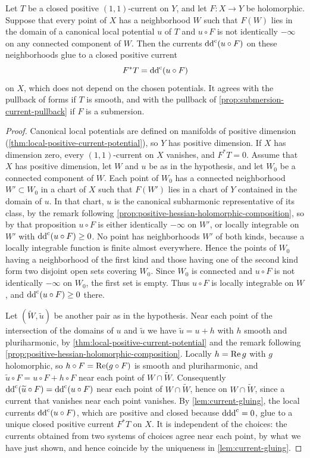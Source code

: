 \begin{proposition}\label{prop:potential-current-pullback}
Let $T$ be a closed positive $(1,1)$-current on $Y$, and let $F\colon X\to Y$ be holomorphic. Suppose that every point of $X$ has a neighborhood $W$ such that $F(W)$ lies in the domain of a canonical local potential $u$ of $T$ and $u\circ F$ is not identically $-\infty$ on any connected component of $W$. Then the currents $\mathrm{dd}^{\mathrm{c}}(u\circ F)$ on these neighborhoods glue to a closed positive current
\[
 F^*T=\mathrm{dd}^{\mathrm{c}}(u\circ F)
\]
on $X$, which does not depend on the chosen potentials. It agrees with the pullback of forms if $T$ is smooth, and with the pullback of \cref{prop:submersion-current-pullback} if $F$ is a submersion.
\end{proposition}
\begin{proof}
Canonical local potentials are defined on manifolds of positive dimension (\cref{thm:local-positive-current-potential}), so $Y$ has positive dimension. If $X$ has dimension zero, every $(1,1)$-current on $X$ vanishes, and $F^*T=0$. Assume that $X$ has positive dimension, let $W$ and $u$ be as in the hypothesis, and let $W_0$ be a connected component of $W$. Each point of $W_0$ has a connected neighborhood $W'\subset W_0$ in a chart of $X$ such that $F(W')$ lies in a chart of $Y$ contained in the domain of $u$. In that chart, $u$ is the canonical subharmonic representative of its class, by the remark following \cref{prop:positive-hessian-holomorphic-composition}, so by that proposition $u\circ F$ is either identically $-\infty$ on $W'$, or locally integrable on $W'$ with $\mathrm{dd}^{\mathrm{c}}(u\circ F)\geq0$. No point has neighborhoods $W'$ of both kinds, because a locally integrable function is finite almost everywhere. Hence the points of $W_0$ having a neighborhood of the first kind and those having one of the second kind form two disjoint open sets covering $W_0$. Since $W_0$ is connected and $u\circ F$ is not identically $-\infty$ on $W_0$, the first set is empty. Thus $u\circ F$ is locally integrable on $W$, and $\mathrm{dd}^{\mathrm{c}}(u\circ F)\geq0$ there.

Let $(\widetilde W,\widetilde u)$ be another pair as in the hypothesis. Near each point of the intersection of the domains of $u$ and $\widetilde u$ we have $\widetilde u=u+h$ with $h$ smooth and pluriharmonic, by \cref{thm:local-positive-current-potential} and the remark following \cref{prop:positive-hessian-holomorphic-composition}. Locally $h=\operatorname{Re} g$ with $g$ holomorphic, so $h\circ F=\operatorname{Re}(g\circ F)$ is smooth and pluriharmonic, and $\widetilde u\circ F=u\circ F+h\circ F$ near each point of $W\cap\widetilde W$. Consequently $\mathrm{dd}^{\mathrm{c}}(\widetilde u\circ F)=\mathrm{dd}^{\mathrm{c}}(u\circ F)$ near each point of $W\cap\widetilde W$, hence on $W\cap\widetilde W$, since a current that vanishes near each point vanishes. By \cref{lem:current-gluing}, the local currents $\mathrm{dd}^{\mathrm{c}}(u\circ F)$, which are positive and closed because $\mathrm d\mathrm{dd}^{\mathrm{c}}=0$, glue to a unique closed positive current $F^*T$ on $X$. It is independent of the choices: the currents obtained from two systems of choices agree near each point, by what we have just shown, and hence coincide by the uniqueness in \cref{lem:current-gluing}.


\end{proof}
